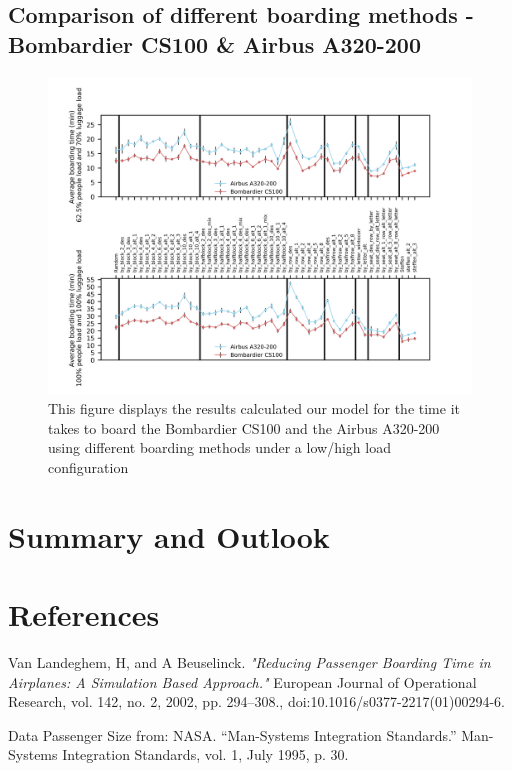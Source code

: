 \documentclass[11pt]{article}
\begin{document}
\subsection{Comparison of different boarding methods - Bombardier CS100 \& Airbus A320-200}
\begin{figure}
	\includegraphics[width=\linewidth]{../../code/AirplaneBoarding/data/figure2/figure2.png}
	\caption{This figure displays the results calculated our model for the time it takes to board the Bombardier CS100 and the Airbus A320-200 using different boarding methods under a low/high load configuration}
	\label{figure2}
\end{figure}


\section{Summary and Outlook}

\section{References}
\begin{thebibliography}{9}
	Van Landeghem, H, and A Beuselinck. 
	\textit{"Reducing Passenger Boarding Time in Airplanes: A Simulation Based Approach."} 
	European Journal of Operational Research, vol. 142, no. 2, 2002, pp. 294–308.,
	doi:10.1016/s0377-2217(01)00294-6.
	
	Data Passenger Size from:  NASA. “Man-Systems Integration Standards.” Man-Systems Integration Standards, vol. 1, July 1995, p. 30.
\end{thebibliography}
\end{document}
